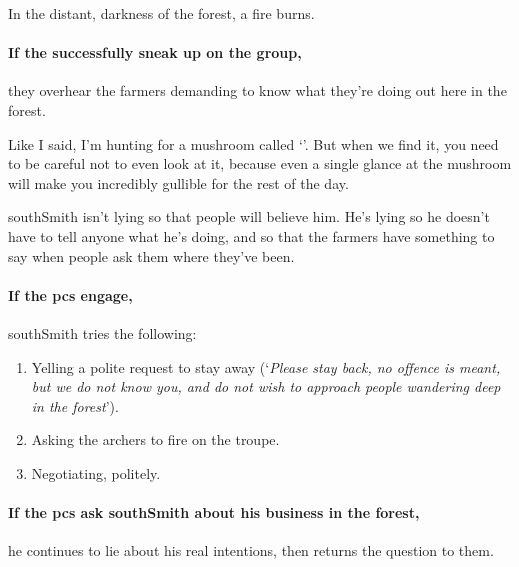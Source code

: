 \begin{boxtext}
  In the distant, darkness of the forest, a fire burns.
\end{boxtext}

\paragraph{If the successfully sneak up on the group,}
they overhear the farmers demanding to know what they're doing out here in the forest.

\begin{speechtext}
  Like I said, I'm hunting for a mushroom called `'.
  But when we find it, you need to be careful not to even look at it, because even a single glance at the mushroom will make you incredibly gullible for the rest of the day.
\end{speechtext}

\Gls{southSmith} isn't lying so that people will believe him.
He's lying so he doesn't have to tell anyone what he's doing, and so that the farmers have something to say when people ask them where they've been.

\paragraph{If the \glspl{pc} engage,}

\Gls{southSmith} tries the following:

\begin{enumerate}
  \item
  Yelling a polite request to stay away (`\textit{Please stay back, no offence is meant, but we do not know you, and do not wish to approach people wandering deep in the forest}').
  \item
  Asking the archers to fire on the troupe.
  \item
  Negotiating, politely.
\end{enumerate}


\label{southSmith}

\paragraph{If the \glspl{pc} ask \gls{southSmith} about his business in the forest,}
he continues to lie about his real intentions, then returns the question to them.

